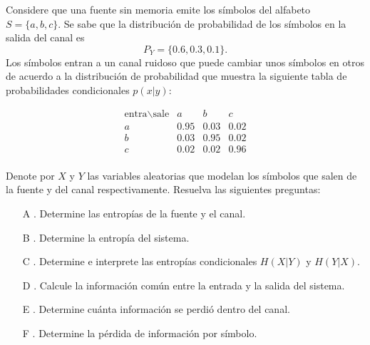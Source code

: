Considere que una fuente sin memoria emite los símbolos del alfabeto $S = \{a, b, c\}$. Se sabe que la distribución de probabilidad de los símbolos en la salida del canal es 
\[
P_Y = \{0\text{.}6, 0\text{.}3, 0\text{.}1\}.
\]
Los símbolos entran a un canal ruidoso que puede cambiar unos símbolos en otros de acuerdo a la distribución de probabilidad que muestra la siguiente tabla de probabilidades condicionales $p(x|y)$:

\[
\begin{array}{c|ccc}
\text{entra} \backslash \text{sale} & a & b & c \\
\hline
a & 0\text{.}95 & 0\text{.}03 & 0\text{.}02 \\
b & 0\text{.}03 & 0\text{.}95 & 0\text{.}02 \\
c & 0\text{.}02 & 0\text{.}02 & 0\text{.}96 \\
\end{array}
\]

Denote por $X$ y $Y$ las variables aleatorias que modelan los símbolos que salen de la fuente y del canal respectivamente. Resuelva las siguientes preguntas:

\begin{enumerate}
    \item[A]. Determine las entropías de la fuente y el canal.
    \item[B]. Determine la entropía del sistema.
    \item[C]. Determine e interprete las entropías condicionales $H(X|Y)$ y $H(Y|X)$.
    \item[D]. Calcule la información común entre la entrada y la salida del sistema.
    \item[E]. Determine cuánta información se perdió dentro del canal.
    \item[F]. Determine la pérdida de información por símbolo.
\end{enumerate}


